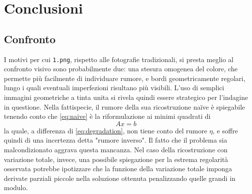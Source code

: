 \documentclass[a4paper]{article}
\begin{document}
\section{Conclusioni}

\subsection{Confronto}
I motivi per cui \verb!1.png!, rispetto alle fotografie tradizionali, si presta
meglio al confronto visivo sono probabilmente due: una stesura omogenea del
colore, che permette più facilmente di individuare rumore, e bordi
geometricamente regolari, lungo i quali eventuali imperfezioni risultano più
visibili. L'uso di semplici immagini geometriche a tinta unita si rivela quindi
essere strategico per l'indagine in questione. Nella fattispecie, il rumore
della sua ricostruzione naïve è spiegabile tenendo conto che \ref{eq:naive} è la
riformulazione ai minimi quadrati di
\begin{equation}
  Ax = b
\end{equation}
la quale, a differenza di \ref{eq:degradation}, non tiene conto del rumore
$\eta$, e soffre quindi di una incertezza detta "rumore inverso". Il fatto che
il problema sia malcondizionato aggrava questa mancanza. Nel caso della
ricostruzione con variazione totale, invece, una possibile spiegazione per la
estrema regolarità osservata potrebbe ipotizzare che la funzione della
variazione totale imponga derivate parziali piccole nella soluzione ottenuta
penalizzando quelle grandi in modulo.
\end{document}
